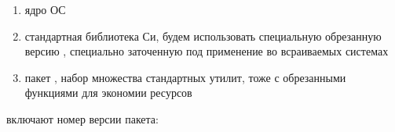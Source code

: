 \begin{enumerate}
  \item {} ядро ОС \linux
  \item {} стандартная библиотека Си, будем использовать специальную
  обрезанную версию , специально заточенную под применение во
  всраиваемых системах
  \item {} пакет , набор множества стандартных утилит,
  тоже с обрезанными функциями для экономии ресурсов 
\end{enumerate}




включают номер версии пакета:




\secup

